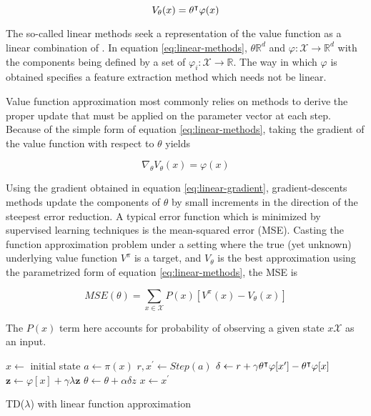 \begin{equation}
V_{\theta}(x) = \theta^\intercal \varphi(x)
\label{eq:linear-methods}
\end{equation}

The so-called linear methods seek a representation of the value function as a linear
combination of . In equation \ref{eq:linear-methods}, $\theta
\mathbb{R}^d$ and $\varphi : \mathcal{X} \to \mathbb{R}^d$ with the components
being defined by a set of  $\varphi_i : \mathcal{X} \to
\mathbb{R}$. The way in which $\varphi$ is obtained specifies a feature extraction
method which needs not be linear. 

Value function approximation most commonly relies on 
methods to derive the proper update that must be applied on the parameter vector at
each step. Because of the simple form of equation \ref{eq:linear-methods}, taking the
gradient of the value function with respect to $\theta$ yields

\begin{equation}
\nabla_{\theta} V_\theta(x) = \varphi(x)
\label{eq:linear-gradient}
\end{equation}

Using the gradient obtained in equation \ref{eq:linear-gradient}, gradient-descents
methods update the components of $\theta$ by small increments in the direction of
the steepest error reduction. A typical error function which is minimized by supervised
learning techniques is the mean-squared error (MSE). Casting the function
approximation problem under a setting where the true (yet unknown) underlying value
function $V^\pi$ is a target, and $V_\theta$ is the best approximation using the
parametrized form of equation \ref{eq:linear-methods}, the MSE is 

\begin{equation}
MSE(\theta) = \sum_{ x \in \mathcal{X}} P(x) \left[ V^\pi(x) - V_\theta(x) \right]
\end{equation}

The $P(x)$ term here accounts for probability of observing a given state $x
\mathcal{X}$ as an input.

\begin{algorithm}
\DontPrintSemicolon
{}
$x \leftarrow$ initial state\;
 {
$a \leftarrow \pi(x)$\;
$r, x^\prime \leftarrow Step(a)$\;
$\delta \leftarrow r + \gamma \theta^\intercal \varphi[x^\prime] -
\theta^\intercal \varphi[x]$\;
$\mathbf{z} \leftarrow \varphi[x] + \gamma \lambda \mathbf{z}$ \;
$\theta \leftarrow \theta + \alpha \delta z$\;
$x \leftarrow x^\prime$
}
\caption{TD($\lambda$) with linear function approximation}
\label{alg:linear-tdlambda}
\end{algorithm}

